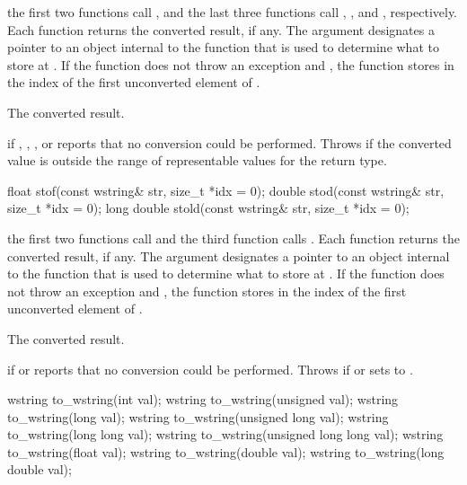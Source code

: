 \begin{itemdescr}
\pnum
\effects the first two functions call ,
and the last three functions call ,
, and , respectively. Each function returns the converted result, if any. The
argument  designates a pointer to an object internal to the function
that is used to determine what to store at . If the function does
not throw an exception and , the function stores in 
the index of the first unconverted element of .

\pnum
\returns The converted result.

\pnum
\throws {} if , , , or
 reports that no conversion could be performed. Throws
 if the converted value is outside the range of representable values
for the return type.
\end{itemdescr}

%
%
%
\begin{itemdecl}
float stof(const wstring& str, size_t *idx = 0);
double stod(const wstring& str, size_t *idx = 0);
long double stold(const wstring& str, size_t *idx = 0);
\end{itemdecl}

\begin{itemdescr}
\pnum
\effects the first two functions call  and the third
function calls . Each function returns the converted
result, if any. The argument  designates a pointer to an object internal to
the function that is used to determine what to store at . If the function
does not throw an exception and , the function stores in 
the index of the first unconverted element of .

\pnum
\returns The converted result.

\pnum
\throws {} if  or  reports that no
conversion could be performed. Throws  if  or
 sets  to .
\end{itemdescr}

%
\begin{itemdecl}
wstring to_wstring(int val);
wstring to_wstring(unsigned val);
wstring to_wstring(long val);
wstring to_wstring(unsigned long val);
wstring to_wstring(long long val);
wstring to_wstring(unsigned long long val);
wstring to_wstring(float val);
wstring to_wstring(double val);
wstring to_wstring(long double val);
\end{itemdecl}


